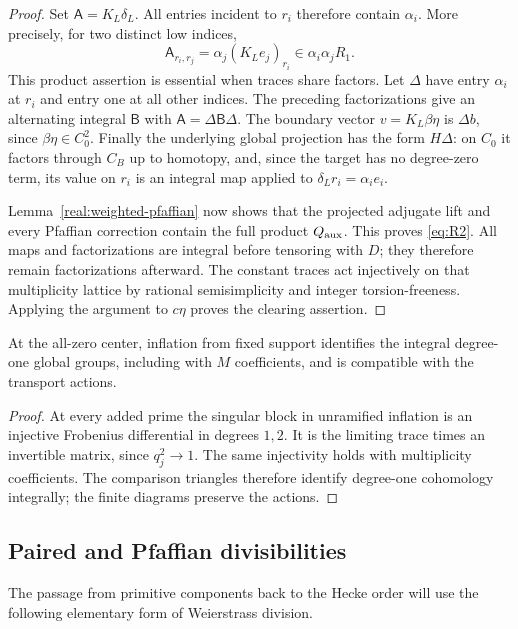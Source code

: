 \begin{proof}
Set \(\mathsf A=K_L\delta_L\). All entries incident to \(r_i\)
therefore contain \(\alpha_i\). More precisely, for two distinct
low indices,
\[
 \mathsf A_{r_i,r_j}
   =\alpha_j(K_Le_j)_{r_i}
   \in\alpha_i\alpha_jR_1.
\]
This product assertion is essential when traces share factors. Let
\(\Delta\) have entry \(\alpha_i\) at \(r_i\) and entry one at
all other indices. The preceding factorizations give an alternating
integral \(\mathsf B\) with \(\mathsf A=\Delta\mathsf B\Delta\).
The boundary vector \(v=K_L\beta\eta\) is \(\Delta b\), since
\(\beta\eta\in C_0^2\). Finally the underlying global projection
has the form \(H\Delta\): on \(C_0\) it factors through \(C_B\)
up to homotopy, and, since the target has no degree-zero term, its
value on \(r_i\) is an integral map applied to
\(\delta_Lr_i=\alpha_i e_i\).

Lemma~\ref{real:weighted-pfaffian} now shows that the projected
adjugate lift and every Pfaffian correction contain the full product
\(Q_{\rm aux}\). This proves \eqref{eq:R2}. All maps and
factorizations are integral before tensoring with \(D\); they
therefore remain factorizations afterward. The constant traces act
injectively on that multiplicity lattice by rational semisimplicity
and integer torsion-freeness. Applying the argument to \(c\eta\)
proves the clearing assertion.
\end{proof}

\begin{lemma}\label{real:center-inflation}
At the all-zero center, inflation from fixed support identifies the
integral degree-one global groups, including with \(M\) coefficients,
and is compatible with the transport actions.
\end{lemma}

\begin{proof}
At every added prime the singular block in unramified inflation is
an injective Frobenius differential in degrees \(1,2\). It is the
limiting trace times an invertible matrix, since \(q_j^2\to1\).
The same injectivity holds with multiplicity coefficients.
The comparison triangles therefore identify degree-one cohomology
integrally; the finite diagrams preserve the actions.
\end{proof}

\subsection{Paired and Pfaffian divisibilities}

The passage from primitive components back to the Hecke order will
use the following elementary form of Weierstrass division.

